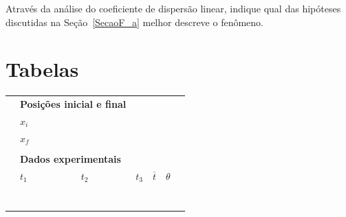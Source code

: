 \begin{question}[type={exam}]{2}
Através da análise do coeficiente de dispersão linear, indique qual das hipóteses discutidas na Seção~\ref{SecaoF_a} melhor descreve o fenômeno.
\end{question}
\vfill

\pagebreak
\section{Tabelas}

\begin{table}[!h]
\centering
\begin{tabular}{lp{25mm}p{25mm}p{25mm}p{25mm}p{25mm}l}
\toprule
	& \multicolumn{2}{l}{\textbf{Posições inicial e final}} \\
	\cmidrule{2-3}
	& $x_i$ \cellcolor[gray]{0.89} & \cellcolor[gray]{0.92} \\
	& $x_f$ \cellcolor[gray]{0.95} & \cellcolor[gray]{0.97} \\
	\cmidrule{2-3}
\\
	& \multicolumn{6}{l}{\textbf{Dados experimentais}} \\
	\cmidrule{2-6}
	& $t_1$ & $t_2$ & $t_3$ & $\overline{t}$ & $\theta$ & \\
	\cmidrule{2-6}
	& \cellcolor[gray]{0.89} & \cellcolor[gray]{0.92} & \cellcolor[gray]{0.89} & \cellcolor[gray]{0.92} & \cellcolor[gray]{0.89} \\
	& \cellcolor[gray]{0.95} & \cellcolor[gray]{0.97} & \cellcolor[gray]{0.95} & \cellcolor[gray]{0.97} & \cellcolor[gray]{0.95} \\
	& \cellcolor[gray]{0.89} & \cellcolor[gray]{0.92} & \cellcolor[gray]{0.89} & \cellcolor[gray]{0.92} & \cellcolor[gray]{0.89} \\
	& \cellcolor[gray]{0.95} & \cellcolor[gray]{0.97} & \cellcolor[gray]{0.95} & \cellcolor[gray]{0.97} & \cellcolor[gray]{0.95} \\
	& \cellcolor[gray]{0.89} & \cellcolor[gray]{0.92} & \cellcolor[gray]{0.89} & \cellcolor[gray]{0.92} & \cellcolor[gray]{0.89} \\
	& \cellcolor[gray]{0.95} & \cellcolor[gray]{0.97} & \cellcolor[gray]{0.95} & \cellcolor[gray]{0.97} & \cellcolor[gray]{0.95} \\
	& \cellcolor[gray]{0.89} & \cellcolor[gray]{0.92} & \cellcolor[gray]{0.89} & \cellcolor[gray]{0.92} & \cellcolor[gray]{0.89} \\

\end{tabular}
\end{table}
